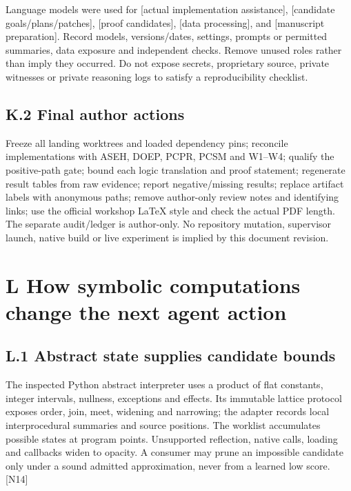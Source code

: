 \documentclass{article}
\begin{document}
Language models were used for [actual implementation assistance], [candidate goals/plans/patches],
[proof candidates], [data processing], and [manuscript preparation]. Record models, versions/dates,
settings, prompts or permitted summaries, data exposure and independent checks. Remove unused
roles rather than imply they occurred. Do not expose secrets, proprietary source, private witnesses or
private reasoning logs to satisfy a reproducibility checklist.

\subsection*{K.2 Final author actions}

Freeze all landing worktrees and loaded dependency pins; reconcile implementations with ASEH,
DOEP, PCPR, PCSM and W1–W4; qualify the positive-path gate; bound each logic translation and
proof statement; regenerate result tables from raw evidence; report negative/missing results; replace
artifact labels with anonymous paths; remove author-only review notes and identifying links; use
the official workshop LaTeX style and check the actual PDF length. The separate audit/ledger is
author-only. No repository mutation, supervisor launch, native build or live experiment is implied by
this document revision.

\section*{L How symbolic computations change the next agent action}
\subsection*{L.1 Abstract state supplies candidate bounds}

The inspected Python abstract interpreter uses a product of flat constants, integer intervals, nullness,
exceptions and effects. Its immutable lattice protocol exposes order, join, meet, widening and
narrowing; the adapter records local interprocedural summaries and source positions. The worklist
accumulates possible states at program points. Unsupported reflection, native calls, loading and
callbacks widen to opacity. A consumer may prune an impossible candidate only under a sound
admitted approximation, never from a learned low score. [N14]
\end{document}
